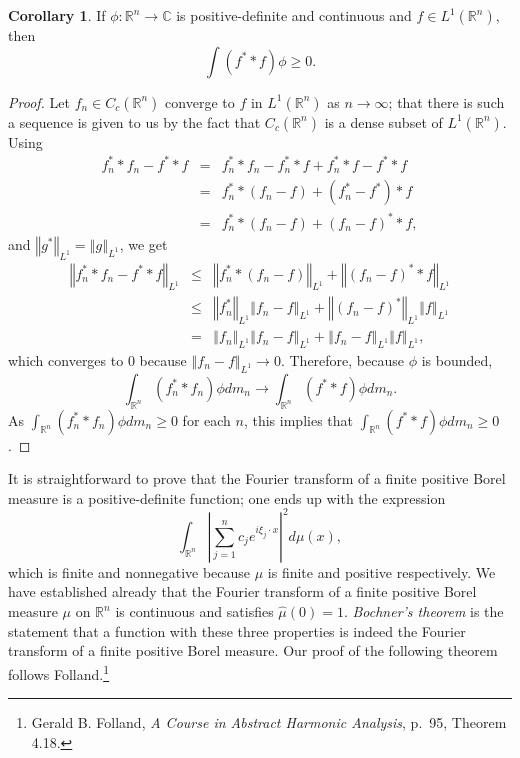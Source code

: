 \documentclass{article}
\newcommand{\norm}[1]{\left\Vert #1 \right\Vert}
\theoremstyle{definition}
\newtheorem{corollary}[theorem]{Corollary}
\theoremstyle{definition}
\begin{document}
\begin{corollary}
If $\phi:\mathbb{R}^n \to \mathbb{C}$ is positive-definite and continuous and $f \in L^1(\mathbb{R}^n)$, then
\[
\int (f^* * f) \phi \geq 0.
\]
\label{positivecor}
\end{corollary}
\begin{proof}
Let $f_n \in C_c(\mathbb{R}^n)$ converge to $f$ in $L^1(\mathbb{R}^n)$ as $n \to \infty$; that there is such a sequence is
given to us by the fact that $C_c(\mathbb{R}^n)$ is a dense subset of $L^1(\mathbb{R}^n)$. 
Using
\begin{eqnarray*}
f_n^* * f_n- f^* * f &=& f_n^* * f_n - f_n^** f + f_n^* *f - f^* * f\\
&=&f_n^**(f_n-f)+(f_n^*-f^*)*f\\
&=&f_n^**(f_n-f)+(f_n-f)^**f,
\end{eqnarray*}
and $\norm{g^*}_{L^1}=\norm{g}_{L^1}$,
we get
\begin{eqnarray*}
\norm{f_n^* * f_n - f^* * f}_{L^1}&\leq&\norm{f_n^**(f_n-f)}_{L^1}+\norm{(f_n-f)^**f}_{L^1}\\
&\leq&\norm{f_n^*}_{L^1} \norm{f_n-f}_{L^1} + \norm{(f_n-f)^*}_{L^1} \norm{f}_{L^1}\\
&=&\norm{f_n}_{L^1} \norm{f_n-f}_{L^1} + \norm{f_n-f}_{L^1} \norm{f}_{L^1},
\end{eqnarray*}
which converges to $0$ because $\norm{f_n-f}_{L^1} \to 0$. Therefore, because $\phi$ is bounded,
\[
\int_{\mathbb{R}^n} (f_n^* * f_n) \phi dm_n \to \int_{\mathbb{R}^n} (f^* * f)\phi dm_n.
\]
As $\int_{\mathbb{R}^n} (f_n^* * f_n)\phi dm_n \geq 0$ for each $n$, this implies that $\int_{\mathbb{R}^n} (f^* * f)\phi dm_n \geq 0$.
\end{proof}



It is straightforward to prove that the Fourier transform of a finite positive Borel measure is a positive-definite function; one ends up with the expression
\[
\int_{\mathbb{R}^n} \left| \sum_{j=1}^n c_j e^{i\xi_j\cdot x} \right|^2 d\mu(x),
\]
which is finite and nonnegative because $\mu$ is finite and positive respectively. We have established already that the
Fourier transform of a finite positive Borel measure $\mu$ on $\mathbb{R}^n$ is continuous and satisfies $\hat{\mu}(0)=1$. {\em Bochner's theorem}
is the statement that a function with these three properties is indeed the Fourier transform of a finite positive Borel measure.
Our proof of the following theorem follows Folland.\footnote{Gerald B. Folland, {\em A Course in Abstract Harmonic Analysis}, p.~95, Theorem 4.18.}
\end{document}
